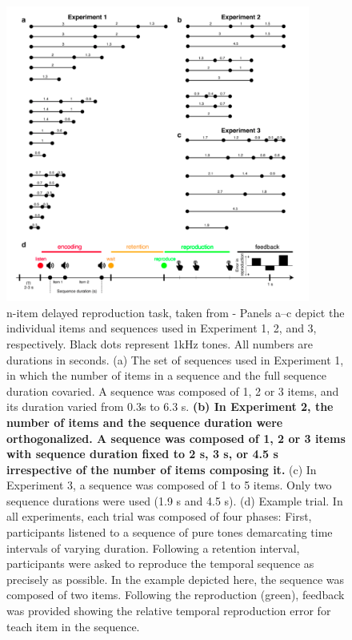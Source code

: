 \begin{figure}[ht]
    \centering
    \includegraphics[width=10cm]{images_report/n-item delayed reproduction task.png}
    \caption[n-item delayed reproduction task]%
    {n-item delayed reproduction task, taken from \cite{herbst2021abstracting} - Panels a–c depict the individual items and sequences used in Experiment 1, 2, and 3, respectively. Black dots represent 1kHz tones. All numbers are durations in seconds. (a) The set of sequences used in Experiment 1, in which the number of items in a sequence and the full sequence duration covaried. A sequence was composed of 1, 2 or 3 items, and its duration varied from 0.3s to 6.3 s. \textbf{(b) In Experiment 2, the number of items and the sequence duration were orthogonalized. A sequence was composed of 1, 2 or 3 items with sequence duration fixed to 2 s, 3 s, or 4.5 s irrespective of the number of items composing it.} (c) In Experiment 3, a sequence was composed of 1 to 5 items. Only two sequence durations were used (1.9 s and 4.5 s). (d) Example trial. In all experiments, each trial was composed of four phases: First, participants listened to a sequence of pure tones demarcating time intervals of varying duration. Following a retention interval, participants were asked to reproduce the temporal sequence as precisely as possible. In the example depicted here, the sequence was composed of two items. Following the reproduction (green), feedback was provided showing the relative temporal reproduction error for teach item in the sequence.}

    \label{paradigm}
\end{figure}


